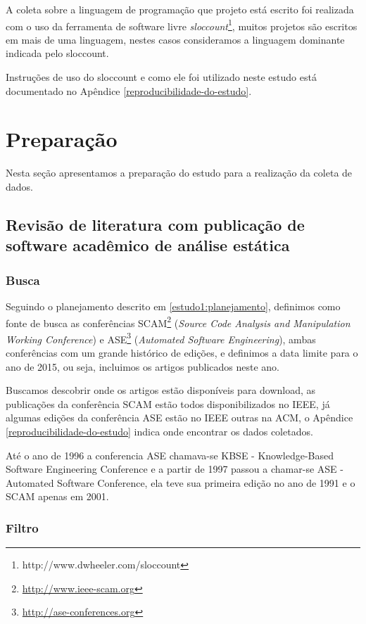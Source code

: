 A coleta sobre a linguagem de programação que projeto está escrito foi
realizada com o uso da ferramenta de software livre {\it
sloccount}\footnote{http://www.dwheeler.com/sloccount}, muitos projetos são
escritos em mais de uma linguagem, nestes casos consideramos a linguagem
dominante indicada pelo sloccount.

Instruções de uso do sloccount e como ele foi utilizado neste estudo está
documentado no Apêndice \ref{reproducibilidade-do-estudo}.


\section{Preparação} \label{estudo1:preparacao} %

Nesta seção apresentamos a preparação do estudo para a realização da coleta de
dados.

\subsection{Revisão de literatura com publicação de software acadêmico de análise estática}

\subsubsection{Busca}

Seguindo o planejamento descrito em \ref{estudo1:planejamento}, definimos como
fonte de busca as conferências SCAM\footnote{\url{http://www.ieee-scam.org}}
({\it Source Code Analysis and Manipulation Working Conference}) e
ASE\footnote{\url{http://ase-conferences.org}} ({\it Automated Software
Engineering}), ambas conferências com um grande histórico de edições, e
definimos a data limite para o ano de 2015, ou seja, incluimos os artigos
publicados neste ano.

Buscamos descobrir onde os artigos estão disponíveis para download, as
publicações da conferência SCAM estão todos disponibilizados no IEEE, já
algumas edições da conferência ASE estão no IEEE outras na ACM, o Apêndice
\ref{reproducibilidade-do-estudo} indica onde encontrar os dados coletados.

Até o ano de 1996 a conferencia ASE chamava-se KBSE - Knowledge-Based Software
Engineering Conference e a partir de 1997 passou a chamar-se ASE - Automated
Software Conference, ela teve sua primeira edição no ano de 1991 e o SCAM
apenas em 2001.

\subsubsection{Filtro}

